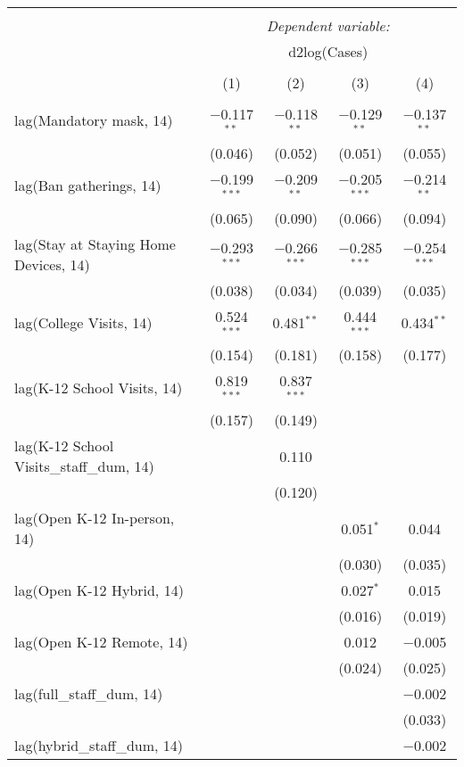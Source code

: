 \begin{tabular}{@{\extracolsep{1pt}}lcccc} 
\\[-1.8ex]\hline 
\hline \\[-1.8ex] 
 & \multicolumn{4}{c}{\textit{Dependent variable:}} \\ 
\cline{2-5} 
 & \multicolumn{4}{c}{d2log(Cases)} \\ 
\\[-1.8ex] & (1) & (2) & (3) & (4)\\ 
\hline \\[-1.8ex] 
 lag(Mandatory mask, 14) & $-$0.117$^{**}$ & $-$0.118$^{**}$ & $-$0.129$^{**}$ & $-$0.137$^{**}$ \\ 
  & (0.046) & (0.052) & (0.051) & (0.055) \\ 
  lag(Ban gatherings, 14) & $-$0.199$^{***}$ & $-$0.209$^{**}$ & $-$0.205$^{***}$ & $-$0.214$^{**}$ \\ 
  & (0.065) & (0.090) & (0.066) & (0.094) \\ 
  lag(Stay at Staying Home Devices, 14) & $-$0.293$^{***}$ & $-$0.266$^{***}$ & $-$0.285$^{***}$ & $-$0.254$^{***}$ \\ 
  & (0.038) & (0.034) & (0.039) & (0.035) \\ 
  lag(College Visits, 14) & 0.524$^{***}$ & 0.481$^{**}$ & 0.444$^{***}$ & 0.434$^{**}$ \\ 
  & (0.154) & (0.181) & (0.158) & (0.177) \\ 
  lag(K-12 School Visits, 14) & 0.819$^{***}$ & 0.837$^{***}$ &  &  \\ 
  & (0.157) & (0.149) &  &  \\ 
  lag(K-12 School Visits\_staff\_dum, 14) &  & 0.110 &  &  \\ 
  &  & (0.120) &  &  \\ 
  lag(Open K-12 In-person, 14) &  &  & 0.051$^{*}$ & 0.044 \\ 
  &  &  & (0.030) & (0.035) \\ 
  lag(Open K-12 Hybrid, 14) &  &  & 0.027$^{*}$ & 0.015 \\ 
  &  &  & (0.016) & (0.019) \\ 
  lag(Open K-12 Remote, 14) &  &  & 0.012 & $-$0.005 \\ 
  &  &  & (0.024) & (0.025) \\ 
  lag(full\_staff\_dum, 14) &  &  &  & $-$0.002 \\ 
  &  &  &  & (0.033) \\ 
  lag(hybrid\_staff\_dum, 14) &  &  &  & $-$0.002 \\ 

\end{tabular}
